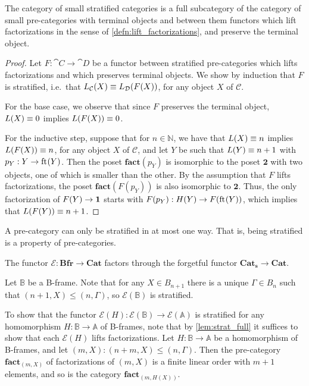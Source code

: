 \begin{lem}
The category of small stratified categories is a full subcategory of the category
of small pre-categories with terminal objects and between them functors which lift 
factorizations in the sense of \autoref{defn:lift_factorizations}, and preserve the terminal object.
\end{lem}

\begin{proof}
Let $F:\cat{C}\to\cat{D}$ be a functor between stratified pre-categories which lifts
factorizations and 
which preserves terminal objects. We show by induction that $F$ is stratified, i.e.~that $L_{\mathcal{C}}(X)\equiv L_{\mathcal{D}}(F(X))$, for any object $X$ of $\mathcal{C}$.

For the base case, we observe that since $F$ preserves the terminal object, $L(X)\equiv 0$ implies $L(F(X))\equiv 0$.

For the inductive step, suppose that for $n\in\mathbb{N}$, we have that $L(X)\equiv n$ implies
$L(F(X))\equiv n$, for any object $X$ of $\mathcal{C}$, and let $Y$ be such that $L(Y)\equiv n+1$ with
$p_Y:Y\to\mathrm{ft}_{}(Y)$. Then the poset $\mathbf{fact}(p_Y)$ is isomorphic to the
poset $\mathbf{2}$ with two objects, one of which is smaller than the other. By the
assumption that $F$ lifts factorizations, the poset $\mathbf{fact}(F(p_Y))$
is also isomorphic to $\mathbf{2}$. Thus, the only factorization
of $F(Y)\to\mathbf{1}$ starts with $F(p_Y):H(Y)\to F(\mathrm{ft}_{}(Y))$, which implies that
$L(F(Y))\equiv n+1$. 
\end{proof}

\begin{cor}
A pre-category can only be stratified in at most one way. That is, being stratified is a property of pre-categories.
\end{cor}

\begin{thm}
The functor $\mathcal{E}:\mathbf{Bfr}\to\mathbf{Cat}$ factors through the forgetful functor $\mathbf{Cat_s}\to\mathbf{Cat}$.
\end{thm}

\begin{constr}
Let $\mathbb{B}$ be a B-frame. Note that for any $X\in B_{n+1}$ there is a unique $\Gamma\in
B_n$ such that $(n+1,X)\leq (n,\Gamma)$, so $\mathcal{E}(\mathbb{B})$ is stratified.

To show that the functor $\mathcal{E}(H):\mathcal{E}(\mathbb{B})\to \mathcal{E}(\mathbb{A})$ is stratified for
any homomorphism $H:\mathbb{B}\to\mathbb{A}$ of B-frames, note that
by \autoref{lem:strat_full} it suffices to show that each $\mathcal{E}(H)$ 
lifts factorizations.
Let $H:\mathbb{B}\to\mathbb{A}$ be a homomorphism of B-frames, and let
$(m,X):(n+m,X)\leq (n,\Gamma)$. Then the pre-category $\mathbf{fact}_{(m,X)}$ of
factorizations of $(m,X)$ is a finite linear order with
$m+1$ elements, and so is the category $\mathbf{fact}_{(m,H(X))}$. 
\end{constr}

